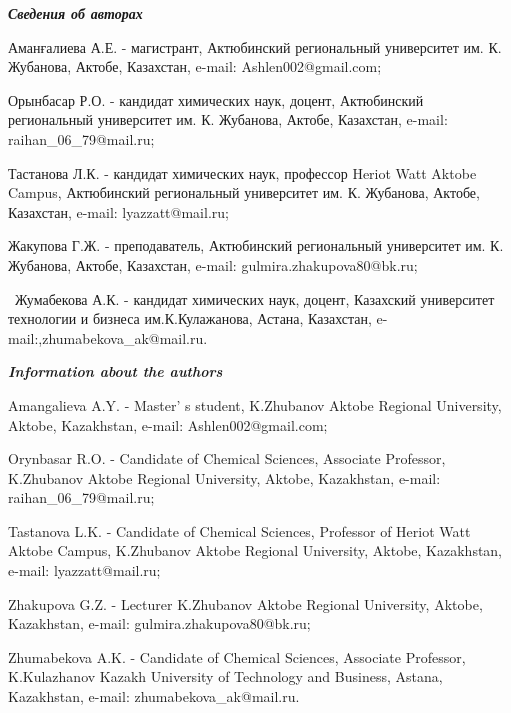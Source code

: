 \begin{info}
\hspace{1em}\emph{{\bfseries Сведения об авторах}}

Аманғалиева А.Е. - магистрант, Актюбинский региональный университет
им.  К. Жубанова, Актобе, Казахстан, e-mail: Ashlen002@gmail.com;

Орынбасар Р.О. - кандидат химических наук, доцент, Актюбинский
региональный университет им. К. Жубанова, Актобе, Казахстан, e-mail:
raihan\_06\_79@mail.ru;

Тастанова Л.К. - кандидат химических наук, профессор Heriot Watt
Aktobe Campus, Актюбинский региональный университет им. К. Жубанова,
Актобе, Казахстан, e-mail: lyazzatt@mail.ru;

Жакупова Г.Ж. - преподаватель, Актюбинский региональный университет
им.  К. Жубанова, Актобе, Казахстан, e-mail:
gulmira.zhakupova80@bk.ru;

~Жумабекова А.К. - кандидат химических наук, доцент, Казахский
университет технологии и бизнеса им.К.Кулажанова, Астана, Казахстан,
e-mail:,zhumabekova\_ak@mail.ru.

\hspace{1em}\emph{{\bfseries Information about the authors}}

Amangalieva A.Y. - Master' s student, K.Zhubanov Aktobe Regional
University, Aktobe, Kazakhstan, e-mail: Ashlen002@gmail.com;

Orynbasar R.O. - Candidate of Chemical Sciences, Associate Professor,
K.Zhubanov Aktobe Regional University, Aktobe, Kazakhstan, e-mail:
raihan\_06\_79@mail.ru;

Tastanova L.K. - Candidate of Chemical Sciences, Professor of Heriot
Watt Aktobe Campus, K.Zhubanov Aktobe Regional University, Aktobe,
Kazakhstan, e-mail: lyazzatt@mail.ru;

Zhakupova G.Z. - Lecturer K.Zhubanov Aktobe Regional University,
Aktobe, Kazakhstan, e-mail: gulmira.zhakupova80@bk.ru;

Zhumabekova A.K. - Candidate of Chemical Sciences, Associate
Professor, K.Kulazhanov Kazakh University of Technology and Business,
Astana, Kazakhstan, e-mail: zhumabekova\_ak@mail.ru.
\end{info}
